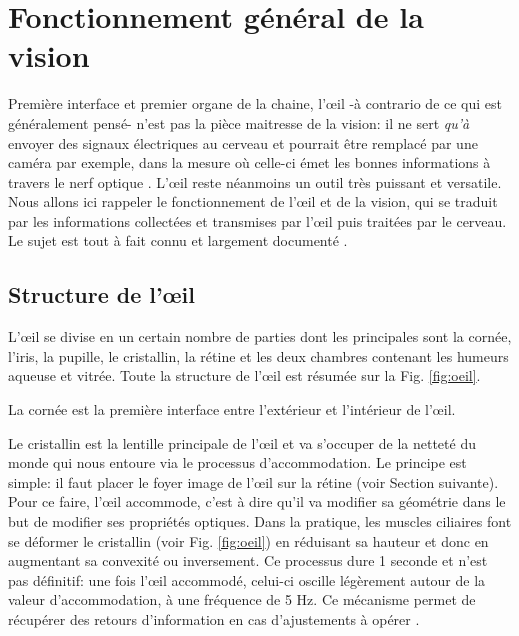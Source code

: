 \chapter{Fonctionnement général de la vision}
\par Première interface et premier organe de la chaine, l'œil -à contrario de ce qui est généralement pensé- n'est pas la pièce maitresse de la vision: il ne sert \textit{qu'à} envoyer des signaux électriques au cerveau et pourrait être remplacé par une caméra par exemple, dans la mesure où celle-ci émet les bonnes informations à travers le nerf optique \citep{dobelle_artificial_2000}. L'œil reste néanmoins un outil très puissant et versatile. Nous allons ici rappeler le fonctionnement de l'œil et de la vision, qui se traduit par les informations collectées et transmises par l'œil puis traitées par le cerveau. Le sujet est tout à fait connu et largement documenté \citep{fairchild_human_2005,wandell_foundations_1995,gross_human_2008,driscoll_eyes_1978}.

	\section{Structure de l'œil}
	\par L'œil se divise en un certain nombre de parties dont les principales sont la cornée, l'iris, la pupille, le cristallin, la rétine et les deux chambres contenant les humeurs aqueuse et vitrée. Toute la structure de l'œil est résumée sur la Fig. \ref{fig:oeil}.
	
	\par La cornée est la première interface entre l'extérieur et l'intérieur de l'œil.
	
	\par Le cristallin est la lentille principale de l'œil et va s'occuper de la netteté du monde qui nous entoure via le processus d'accommodation. Le principe est simple: il faut placer le foyer image de l'œil sur la rétine (voir Section suivante). Pour ce faire, l'œil accommode, c'est à dire qu'il va modifier sa géométrie dans le but de modifier ses propriétés optiques. Dans la pratique, les muscles ciliaires font se déformer le cristallin (voir Fig. \ref{fig:oeil}) en réduisant sa hauteur et donc en augmentant sa convexité ou inversement. Ce processus dure 1 seconde et n'est pas définitif: une fois l'œil accommodé, celui-ci oscille légèrement autour de la valeur  d'accommodation, à une fréquence de 5 Hz. Ce mécanisme permet de récupérer des retours d'information en cas d'ajustements à opérer \citep{gross_human_2008}.
	
